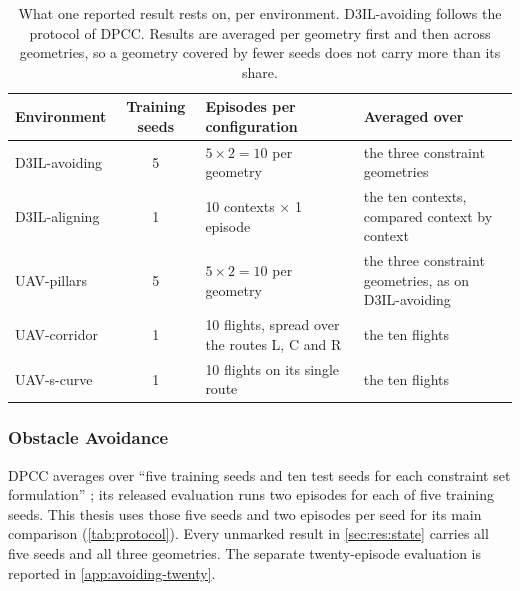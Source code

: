 \begin{table}[htpb]
  \caption[Evaluation protocol per environment]{What one reported result rests on, per environment.
  D3IL-avoiding follows the protocol of \ac{DPCC}. Results are averaged per geometry first and then
  across geometries, so a geometry covered by fewer seeds does not carry more than its share.}
  \label{tab:protocol}
  \centering
  \small
  \setlength{\tabcolsep}{6pt}
  \renewcommand{\arraystretch}{1.2}
  \begin{tabularx}{\linewidth}{@{}l c L X@{}}
    \toprule
    Environment & Training seeds & Episodes per configuration & Averaged over \\
    \midrule
    D3IL-avoiding & 5
      & $5\times2 = 10$ per geometry
      & the three constraint geometries \\
    D3IL-aligning & 1
      & 10 contexts $\times$ 1 episode
      & the ten contexts, compared context by context \\
    UAV-pillars & 5 & $5\times2 = 10$ per geometry & the three constraint geometries, as on D3IL-avoiding \\
    UAV-corridor & 1 & 10 flights, spread over the routes L, C and R & the ten flights \\
    UAV-s-curve & 1 & 10 flights on its single route & the ten flights \\
    \bottomrule
  \end{tabularx}
\end{table}

\subsubsection{Obstacle Avoidance}\label{sec:setup:protocol:avoiding}

\ac{DPCC} averages over \enquote{five training seeds and ten test seeds for each constraint set
formulation} \parencite[Sec.~6.1]{romer2025diffusion}; its released evaluation runs two episodes for each of
five training seeds. This thesis uses those five seeds and two episodes per seed for its main comparison
(\autoref{tab:protocol}). Every unmarked result in \autoref{sec:res:state} carries all five seeds and all
three geometries. The separate twenty-episode evaluation is reported in
\autoref{app:avoiding-twenty}.

